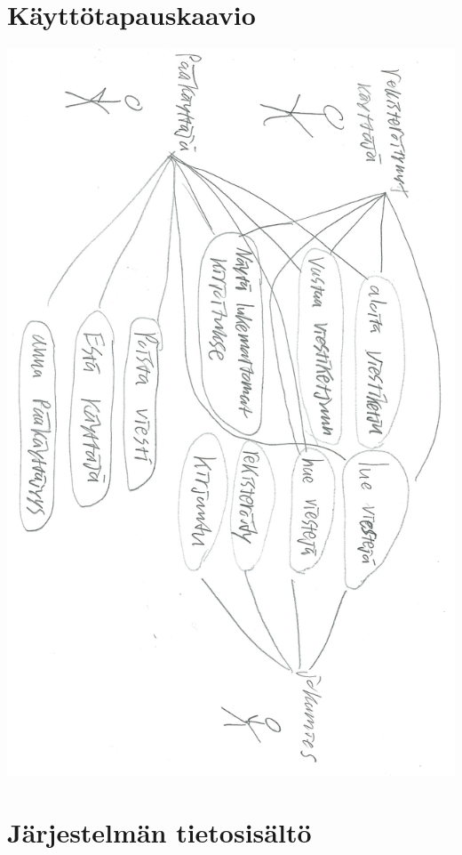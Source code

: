 \documentclass[a4paper, 12pt, finnish]{article}
\begin{document}
\section{Käyttötapauskaavio}
\includegraphics[width=\textwidth,height=\textheight,keepaspectratio]{kayttotapauskaavio.png}

\section{Järjestelmän tietosisältö}
\end{document}
